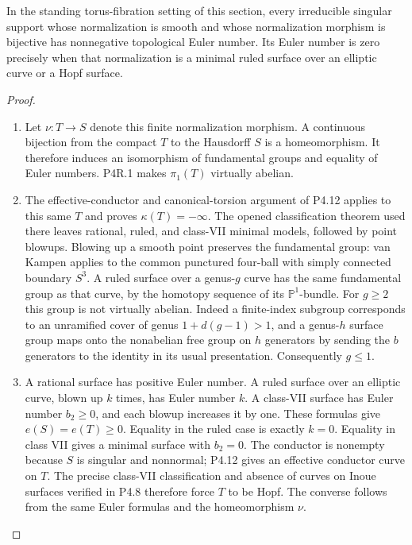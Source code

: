 \begin{proposition}[P4R.2]\hypertarget{tag-02YD}{}\label{night:P4R.2}\label{stmt:P4R.2}

In the standing torus-fibration setting of this section, every irreducible singular support
whose normalization is smooth and whose normalization morphism
is bijective has nonnegative topological Euler number.
Its Euler number is zero precisely when that normalization is
a minimal ruled surface over an elliptic curve or a Hopf surface.
\end{proposition}
\begin{proof}

\begin{enumerate}[label={$\langle1\rangle$\arabic*.},leftmargin=*]
\item Let $\nu:T\to S$ denote this finite normalization morphism.
A continuous bijection from the compact $T$ to the Hausdorff
$S$ is a homeomorphism. It therefore induces an isomorphism
of fundamental groups and equality of Euler numbers. P4R.1
makes $\pi_1(T)$ virtually abelian.

\item The effective-conductor and canonical-torsion argument of
P4.12 applies to this same $T$ and proves $\kappa(T)=-\infty$.
The opened classification theorem used there leaves rational,
ruled, and class-VII minimal models, followed by point blowups.
Blowing up a smooth point preserves the fundamental group:
van Kampen applies to the common punctured four-ball with
simply connected boundary $S^3$. A ruled surface over a
genus-$g$ curve has the same fundamental group as that curve,
by the homotopy sequence of its $\mathbb P^1$-bundle.
For $g\ge2$ this group is not virtually abelian. Indeed a
finite-index subgroup corresponds to an unramified cover
of genus $1+d(g-1)>1$, and a genus-$h$ surface group maps
onto the nonabelian free group on $h$ generators by sending
the $b$ generators to the identity in its usual presentation.
Consequently $g\le1$.

\item A rational surface has positive Euler number. A ruled surface
over an elliptic curve, blown up $k$ times, has Euler number
$k$. A class-VII surface has Euler number $b_2\ge0$, and
each blowup increases it by one. These formulas give
$e(S)=e(T)\ge0$. Equality in the ruled case is exactly
$k=0$. Equality in class VII gives a minimal surface with
$b_2=0$. The conductor is nonempty because $S$ is singular
and nonnormal; P4.12 gives an effective conductor curve on
$T$. The precise class-VII classification and absence of
curves on Inoue surfaces verified in P4.8 therefore force
$T$ to be Hopf. The converse follows from the same Euler
formulas and the homeomorphism $\nu$.

\end{enumerate}
\end{proof}